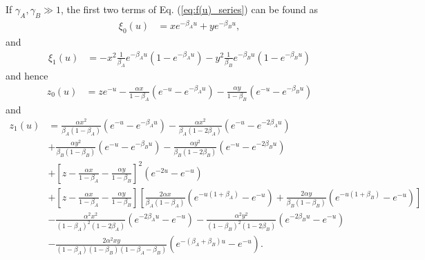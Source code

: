 \documentclass[11pt]{article}
\begin{document}
If $\gamma_A, \gamma_B \gg 1$, the first two terms of Eq. (\ref{eq:f(u)_series}) can be found as
\begin{align}
    \xi_0(u) &= x e^{-\beta_A u} + y e^{-\beta_B u},
\end{align}
and
\begin{align}
    \xi_1(u) &= -x^2 \frac{1}{\beta_A}e^{-\beta_A u} \left(1-e^{-\beta_Au}\right)
    -y^2 \frac{1}{\beta_B}e^{-\beta_B u} \left(1-e^{-\beta_Bu}\right)
\end{align}
and hence
\begin{align}
    z_0(u) &= z e^{-u} - \frac{\alpha x}{1-\beta_A}\left(e^{-u}-e^{-\beta_A u}\right) - \frac{\alpha y}{1-\beta_B}\left(e^{-u}-e^{-\beta_B u}\right)
\end{align}
and 
\begin{align}
    z_1(u) &= \frac{\alpha x^2}{\beta_A (1-\beta_A)}\left(e^{-u}-e^{-\beta_A u}\right)
    - \frac{\alpha x^2}{\beta_A (1-2\beta_A)}\left(e^{-u}-e^{-2\beta_A u}\right) \\ \nonumber
    &+ \frac{\alpha y^2}{\beta_B (1-\beta_B)}\left(e^{-u}-e^{-\beta_B u}\right)
    - \frac{\alpha y^2}{\beta_B (1-2\beta_B)}\left(e^{-u}-e^{-2\beta_B u}\right) \\ \nonumber
    &+ \left[z-\frac{\alpha x}{1-\beta_A}-\frac{\alpha y}{1 - \beta_B}\right]^2\left(e^{-2u}-e^{-u}\right) \\ \nonumber
    &+ \left[z-\frac{\alpha x}{1-\beta_A}-\frac{\alpha y}{1 - \beta_B}\right]\left[\frac{2\alpha x}{\beta_A(1-\beta_A)}\left(e^{-u(1+\beta_A)}-e^{-u}\right) + \frac{2\alpha y}{\beta_B(1-\beta_B)}\left(e^{-u(1+\beta_B)}-e^{-u}\right)\right] \\ \nonumber
    &- \frac{\alpha^2x^2}{(1-\beta_A)^2(1-2\beta_A)}\left(e^{-2\beta_A u} -e^{-u}\right) - \frac{\alpha^2y^2}{(1-\beta_B)^2(1-2\beta_B)}\left(e^{-2\beta_B u} -e^{-u}\right) \\ \nonumber
    & -\frac{2\alpha^2 xy}{(1-\beta_A)(1-\beta_B)(1-\beta_A-\beta_B)}\left(e^{-(\beta_A+\beta_B)u}-e^{-u}\right).
\end{align}
\end{document}
